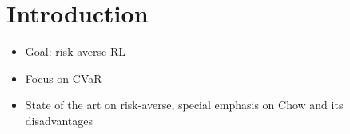 \chapter{Introduction}
\label{sec:introduction}

\begin{itemize}
    \item Goal: risk-averse RL
    \item Focus on CVaR
    \item State of the art on risk-averse, special emphasis on Chow and its disadvantages
\end{itemize}